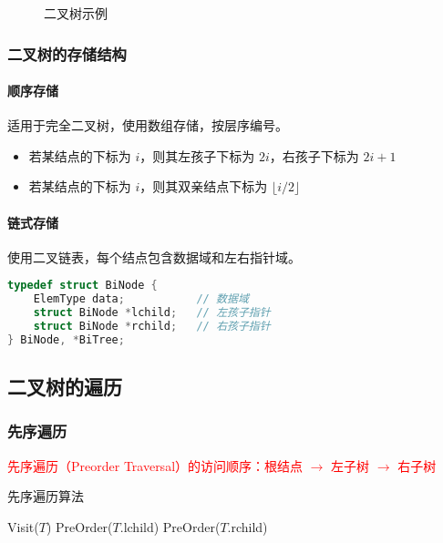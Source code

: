 \documentclass{../../note}
\begin{document}
\begin{figure}[h]
\centering
{}
\caption{二叉树示例}
\end{figure}

\subsubsection{二叉树的存储结构}

\paragraph{顺序存储} 适用于完全二叉树，使用数组存储，按层序编号。
\begin{itemize}
\item 若某结点的下标为 $i$，则其左孩子下标为 $2i$，右孩子下标为 $2i+1$
\item 若某结点的下标为 $i$，则其双亲结点下标为 $\lfloor i/2 \rfloor$
\end{itemize}

\paragraph{链式存储} 使用二叉链表，每个结点包含数据域和左右指针域。
\begin{lstlisting}[language=C]
typedef struct BiNode {
    ElemType data;           // 数据域
    struct BiNode *lchild;   // 左孩子指针
    struct BiNode *rchild;   // 右孩子指针
} BiNode, *BiTree;
\end{lstlisting}

\subsection{二叉树的遍历}

\subsubsection{先序遍历}
\textcolor{red}{先序遍历（Preorder Traversal）的访问顺序：根结点 $\rightarrow$ 左子树 $\rightarrow$ 右子树}

\begin{algorithm}
\caption{先序遍历算法}
\begin{algorithmic}[1]
  \State Visit($T$)          
  \State PreOrder($T$.lchild) 
  \State PreOrder($T$.rchild) 
  \EndIf
  \EndProcedure
\end{algorithmic}
\end{algorithm}
\end{document}
